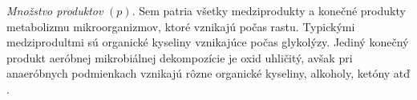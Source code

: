 \textit{Množstvo produktov} $(p)$. Sem patria všetky medziprodukty a konečné produkty metabolizmu mikroorganizmov, ktoré vznikajú počas rastu. Typickými medziprodultmi sú organické kyseliny vznikajúce počas glykolýzy. Jediný konečný produkt aeróbnej mikrobiálnej dekompozície je oxid uhličitý, avšak pri anaeróbnych podmienkach vznikajú rôzne organické kyseliny, alkoholy, ketóny atď \cite{ref2}. 

